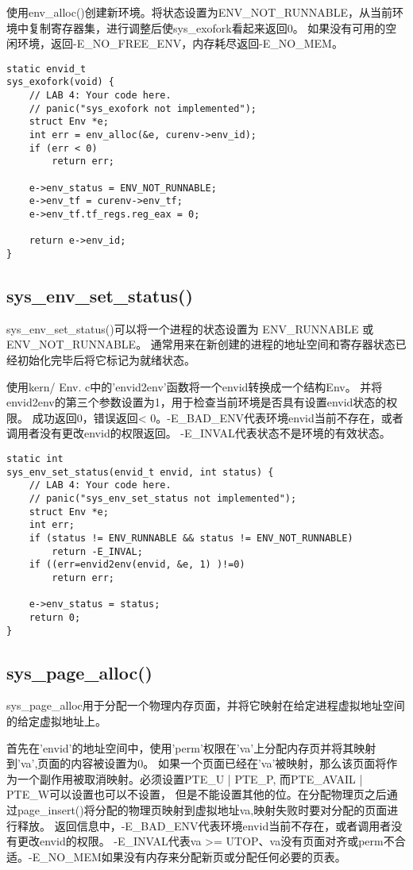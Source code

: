 \documentclass[12pt,a4paper]{article}
\begin{document}
    使用env\_alloc()创建新环境。将状态设置为ENV\_NOT\_RUNNABLE，从当前环境中复制寄存器集，进行调整后使sys\_exofork看起来返回0。
    如果没有可用的空闲环境，返回-E\_NO\_FREE\_ENV，内存耗尽返回-E\_NO\_MEM。

    \begin{lstlisting}[style=CPP]
static envid_t
sys_exofork(void) {
    // LAB 4: Your code here.
    // panic("sys_exofork not implemented");
    struct Env *e;
    int err = env_alloc(&e, curenv->env_id);
    if (err < 0) 
        return err;

    e->env_status = ENV_NOT_RUNNABLE;
    e->env_tf = curenv->env_tf;
    e->env_tf.tf_regs.reg_eax = 0;

    return e->env_id;
}
    \end{lstlisting}

    \subsection{sys\_env\_set\_status()}
    sys\_env\_set\_status()可以将一个进程的状态设置为 ENV\_RUNNABLE 或 ENV\_NOT\_RUNNABLE。
    通常用来在新创建的进程的地址空间和寄存器状态已经初始化完毕后将它标记为就绪状态。

    使用kern/ Env. c中的'envid2env'函数将一个envid转换成一个结构Env。
    并将envid2env的第三个参数设置为1，用于检查当前环境是否具有设置envid状态的权限。
    成功返回0，错误返回< 0。-E\_BAD\_ENV代表环境envid当前不存在，或者调用者没有更改envid的权限返回。
    -E\_INVAL代表状态不是环境的有效状态。

    \begin{lstlisting}[style=CPP]
static int
sys_env_set_status(envid_t envid, int status) {
    // LAB 4: Your code here.
    // panic("sys_env_set_status not implemented");
    struct Env *e;
    int err;
    if (status != ENV_RUNNABLE && status != ENV_NOT_RUNNABLE) 
        return -E_INVAL;  
    if ((err=envid2env(envid, &e, 1) )!=0) 
        return err;

    e->env_status = status;
    return 0;   
}
    \end{lstlisting}

    \subsection{sys\_page\_alloc()}
    sys\_page\_alloc用于分配一个物理内存页面，并将它映射在给定进程虚拟地址空间的给定虚拟地址上。 

    首先在'envid'的地址空间中，使用'perm'权限在'va'上分配内存页并将其映射到'va',页面的内容被设置为0。
    如果一个页面已经在'va'被映射，那么该页面将作为一个副作用被取消映射。必须设置PTE\_U | PTE\_P, 而PTE\_AVAIL | PTE\_W可以设置也可以不设置，
    但是不能设置其他的位。在分配物理页之后通过page\_insert()将分配的物理页映射到虚拟地址va,映射失败时要对分配的页面进行释放。
    返回信息中，-E\_BAD\_ENV代表环境envid当前不存在，或者调用者没有更改envid的权限。
    -E\_INVAL代表va >= UTOP、va没有页面对齐或perm不合适。-E\_NO\_MEM如果没有内存来分配新页或分配任何必要的页表。
\end{document}
